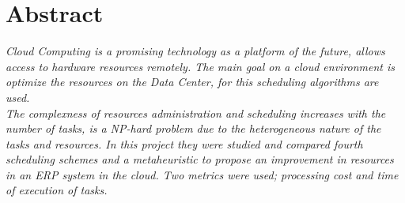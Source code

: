 \chapter*{Abstract}

 \textit{Cloud Computing is a promising technology as a platform of the future, allows access to hardware resources remotely. The main goal on a cloud environment is optimize the resources on the Data Center, for this scheduling algorithms are used.\\ The complexness of resources administration and scheduling increases with the number of tasks, is a NP-hard problem due to the heterogeneous nature of the tasks and resources.
In this project they were studied and compared fourth scheduling schemes and a metaheuristic to propose an improvement in resources in an ERP system in the cloud. Two metrics were used; processing cost and time of execution of tasks.}



